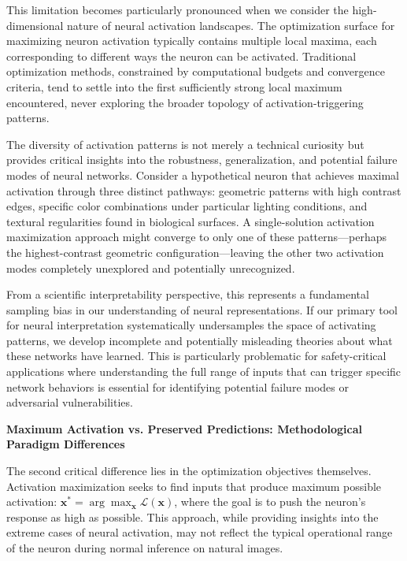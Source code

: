 \documentclass[licencjacka,en]{pracamgr}
\begin{document}
This limitation becomes particularly pronounced when we consider the high-dimensional nature of neural activation landscapes. The optimization surface for maximizing neuron activation typically contains multiple local maxima, each corresponding to different ways the neuron can be activated. Traditional optimization methods, constrained by computational budgets and convergence criteria, tend to settle into the first sufficiently strong local maximum encountered, never exploring the broader topology of activation-triggering patterns.

The diversity of activation patterns is not merely a technical curiosity but provides critical insights into the robustness, generalization, and potential failure modes of neural networks. Consider a hypothetical neuron that achieves maximal activation through three distinct pathways: geometric patterns with high contrast edges, specific color combinations under particular lighting conditions, and textural regularities found in biological surfaces. A single-solution activation maximization approach might converge to only one of these patterns—perhaps the highest-contrast geometric configuration—leaving the other two activation modes completely unexplored and potentially unrecognized.

From a scientific interpretability perspective, this represents a fundamental sampling bias in our understanding of neural representations. If our primary tool for neural interpretation systematically undersamples the space of activating patterns, we develop incomplete and potentially misleading theories about what these networks have learned. This is particularly problematic for safety-critical applications where understanding the full range of inputs that can trigger specific network behaviors is essential for identifying potential failure modes or adversarial vulnerabilities.

\textbf{Maximum Activation vs. Preserved Predictions: Methodological Paradigm Differences}

The second critical difference lies in the optimization objectives themselves. Activation maximization seeks to find inputs that produce maximum possible activation: $\mathbf{x}^* = \arg\max_{\mathbf{x}} \mathcal{L}(\mathbf{x})$, where the goal is to push the neuron's response as high as possible. This approach, while providing insights into the extreme cases of neural activation, may not reflect the typical operational range of the neuron during normal inference on natural images.
\end{document}
